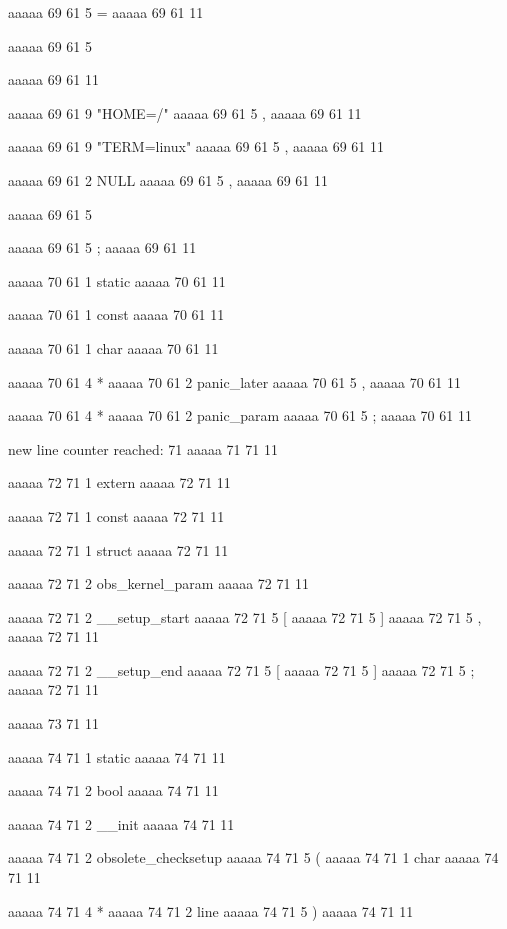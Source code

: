 aaaaa 69 61
5
=
aaaaa 69 61
11
 
aaaaa 69 61
5
{
aaaaa 69 61
11
 
aaaaa 69 61
9
"HOME=/"
aaaaa 69 61
5
,
aaaaa 69 61
11
 
aaaaa 69 61
9
"TERM=linux"
aaaaa 69 61
5
,
aaaaa 69 61
11
 
aaaaa 69 61
2
NULL
aaaaa 69 61
5
,
aaaaa 69 61
11
 
aaaaa 69 61
5
}
aaaaa 69 61
5
;
aaaaa 69 61
11


aaaaa 70 61
1
static
aaaaa 70 61
11
 
aaaaa 70 61
1
const
aaaaa 70 61
11
 
aaaaa 70 61
1
char
aaaaa 70 61
11
 
aaaaa 70 61
4
*
aaaaa 70 61
2
panic_later
aaaaa 70 61
5
,
aaaaa 70 61
11
 
aaaaa 70 61
4
*
aaaaa 70 61
2
panic_param
aaaaa 70 61
5
;
aaaaa 70 61
11


new line counter reached: 71
aaaaa 71 71
11


aaaaa 72 71
1
extern
aaaaa 72 71
11
 
aaaaa 72 71
1
const
aaaaa 72 71
11
 
aaaaa 72 71
1
struct
aaaaa 72 71
11
 
aaaaa 72 71
2
obs_kernel_param
aaaaa 72 71
11
 
aaaaa 72 71
2
__setup_start
aaaaa 72 71
5
[
aaaaa 72 71
5
]
aaaaa 72 71
5
,
aaaaa 72 71
11
 
aaaaa 72 71
2
__setup_end
aaaaa 72 71
5
[
aaaaa 72 71
5
]
aaaaa 72 71
5
;
aaaaa 72 71
11


aaaaa 73 71
11


aaaaa 74 71
1
static
aaaaa 74 71
11
 
aaaaa 74 71
2
bool
aaaaa 74 71
11
 
aaaaa 74 71
2
__init
aaaaa 74 71
11
 
aaaaa 74 71
2
obsolete_checksetup
aaaaa 74 71
5
(
aaaaa 74 71
1
char
aaaaa 74 71
11
 
aaaaa 74 71
4
*
aaaaa 74 71
2
line
aaaaa 74 71
5
)
aaaaa 74 71
11


